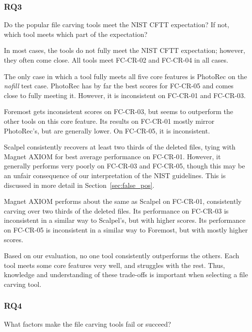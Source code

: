 \subsubsection{RQ3}

\begin{paraphrase}
Do the popular file carving tools meet the NIST CFTT expectation? 
If not, which tool meets which part of the expectation?
\end{paraphrase}

In most cases, the tools do not fully meet the NIST CFTT expectation; however, they often come close.
All tools meet FC-CR-02 and FC-CR-04 in all cases.

The only case in which a tool fully meets all five core features is PhotoRec on the \emph{nofill} test case.
PhotoRec has by far the best scores for FC-CR-05 and comes close to fully meeting it.
However, it is inconsistent on FC-CR-01 and FC-CR-03.

Foremost gets inconsistent scores on FC-CR-03, but seems to outperform the other tools on this core feature.
Its results on FC-CR-01 mostly mirror PhotoRec's, but are generally lower.
On FC-CR-05, it is inconsistent.

Scalpel consistently recovers at least two thirds of the deleted files, tying with Magnet AXIOM for best average performance on FC-CR-01.
However, it generally performs very poorly on FC-CR-03 and FC-CR-05, though this may be an unfair consequence of our interpretation of the NIST guidelines.
This is discussed in more detail in Section~\ref{sec:false_pos}.

Magnet AXIOM performs about the same as Scalpel on FC-CR-01, consistently carving over two thirds of the deleted files.
Its performance on FC-CR-03 is inconsistent in a similar way to Scalpel's, but with higher scores.
Its performance on FC-CR-05 is inconsistent in a similar way to Foremost, but with mostly higher scores.

Based on our evaluation, no one tool consistently outperforms the others.
Each tool meets some core features very well, and struggles with the rest.
Thus, knowledge and understanding of these trade-offs is important when selecting a file carving tool.




\subsubsection{RQ4}

\begin{paraphrase}
What factors make the file carving tools fail or succeed?
\end{paraphrase}

